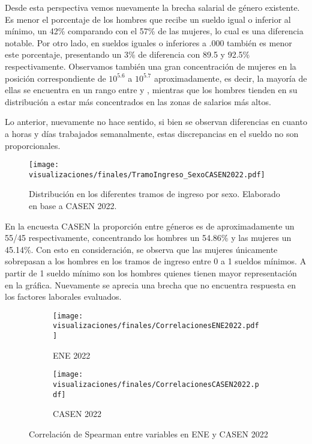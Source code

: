 \FloatBarrier

Desde esta perspectiva vemos nuevamente la brecha salarial de género existente. Es menor el porcentaje de los hombres que recibe un sueldo igual o inferior al mínimo, un 42\% comparando con el 57\% de las mujeres, lo cual es una diferencia notable. Por otro lado, en sueldos iguales o inferiores a .000 también es menor este porcentaje, presentando un 3\% de diferencia con 89.5 y 92.5\% respectivamente. Observamos también una gran concentración de mujeres en la posición correspondiente de $10^5.6$ a $10^5.7$ aproximadamente, es decir, la mayoría de ellas se encuentra en un rango entre  y , mientras que los hombres tienden en su distribución a estar más concentrados en las zonas de salarios más altos. 

Lo anterior, nuevamente no hace sentido, si bien se observan diferencias en cuanto a horas y días trabajados semanalmente, estas discrepancias en el sueldo no son proporcionales.

\FloatBarrier

\begin{figure}[htbp]
	\centering
	\texttt{[image: visualizaciones/finales/TramoIngreso\_SexoCASEN2022.pdf]}
	\caption{Distribución en los diferentes tramos de ingreso por sexo. Elaborado en base a CASEN 2022.}
	\label{07fig} 
\end{figure}

\FloatBarrier

En la encuesta CASEN la proporción entre géneros es de aproximadamente un 55/45 respectivamente, concentrando los hombres un 54.86\% y las mujeres un 45.14\%. Con esto en consideración, se observa que las mujeres únicamente sobrepasan a los hombres en los tramos de ingreso entre 0 a 1 sueldos mínimos. A partir de 1 sueldo mínimo son los hombres quienes tienen mayor representación en la gráfica. Nuevamente se aprecia una brecha que no encuentra respuesta en los factores laborales evaluados.

\FloatBarrier

\begin{figure}[htbp]
	\centering
	\begin{subfigure}[b]{0.49\textwidth}
		\centering
		\texttt{[image: visualizaciones/finales/CorrelacionesENE2022.pdf]}
		\caption{ENE 2022}
		\label{8a} 
	\end{subfigure}
	\hfill
	\begin{subfigure}[b]{0.49\textwidth}
		\centering
		\texttt{[image: visualizaciones/finales/CorrelacionesCASEN2022.pdf]}
		\caption{CASEN 2022}
		\label{8b}
	\end{subfigure}
	\caption{Correlación de Spearman entre variables en ENE y CASEN 2022}
	\label{08fig}
\end{figure}

